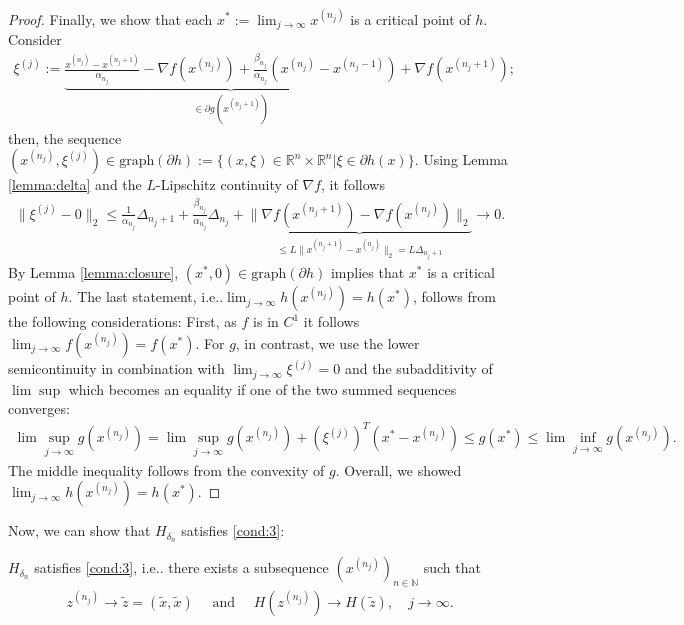 \documentclass[onecolumn,final,a4paper,13pt,reqno]{siamart}
\makeatletter
\DeclareRobustCommand\onedot{\futurelet\@let@token\@onedot}
\def\@onedot{\ifx\@let@token.\else.\null\fi\xspace}
\def\ie{{i.e}\onedot} \def\Ie{{I.e}\onedot}
\makeatother
\begin{document}
\begin{proof}
	Finally, we show that each $x^\ast := \lim_{j \rightarrow \infty} x^{(n_j)}$ is a critical point of $h$. Consider
	\begin{align}
		\xi^{(j)} := \underbrace{\frac{x^{(n_j)} - x^{(n_j + 1)}}{\alpha_{n_j}} - \nabla f(x^{(n_j)}) + \frac{\beta_{n_j}}{\alpha_{n_j}} (x^{(n_j)} - x^{(n_j - 1)})}_{\in \partial g(x^{(n_j + 1)})} + \nabla f(x^{(n_j + 1)});
	\end{align}
	then, the sequence $(x^{(n_j)}, \xi^{(j)}) \in \text{graph}(\partial h) := \{(x, \xi) \in \mathbb{R}^n \times \mathbb{R}^n | \xi \in \partial h(x)\}$. Using Lemma \ref{lemma:delta} and the $L$-Lipschitz continuity of $\nabla f$, it follows
	\begin{align}
		\|\xi^{(j)} - 0\|_2 \leq \frac{1}{\alpha_{n_j}} \Delta_{n_j + 1} + \frac{\beta_{n_j}}{\alpha_{n_j}}\Delta_{n_j} + \underbrace{\|\nabla f(x^{(n_j + 1)}) - \nabla f(x^{(n_j)})\|_2}_{\leq L\|x^{(n_j + 1)} - x^{(n_j)}\|_2 = L\Delta_{n_j + 1}} \rightarrow 0.
	\end{align}
	By Lemma \ref{lemma:closure}, $(x^\ast, 0) \in \text{graph}(\partial h)$ implies that $x^\ast$ is a critical point of $h$. The last statement, \ie $\lim_{j \rightarrow \infty} h(x^{(n_j)}) = h(x^\ast)$, follows from the following considerations: First, as $f$ is in $C^1$ it follows $\lim_{j \rightarrow \infty} f(x^{(n_j)}) = f(x^\ast)$. For $g$, in contrast, we use the lower semicontinuity in combination with $\lim_{j \rightarrow \infty} \xi^{(j)} = 0$ and the subadditivity of $\lim\sup$ which becomes an equality if one of the two summed sequences converges:
	\begin{align}
		\lim\sup_{j \rightarrow \infty} g(x^{(n_j)}) = \lim\sup_{j \rightarrow \infty} g(x^{(n_j)}) + (\xi^{(j)})^T(x^\ast - x^{(n_j)}) \leq g(x^\ast) \leq \lim\inf_{j \rightarrow \infty} g(x^{(n_j)}).
	\end{align}
	The middle inequality follows from the convexity of $g$. Overall, we showed $\lim_{j \rightarrow \infty} h(x^{(n_j)}) = h(x^\ast)$.
\end{proof}

Now, we can show that $H_{\delta_n}$ satisfies \ref{cond:3}:

\begin{lemmamd}
	$H_{\delta_n}$ satisfies \ref{cond:3}, \ie there exists a subsequence $(x^{(n_j)})_{n \in \mathbb{N}}$ such that
	\begin{align}
		z^{(n_j)} \rightarrow \tilde{z} = (\tilde{x}, \tilde{x})\quad\text{ and }\quad H(z^{(n_j)}) \rightarrow H(\tilde{z}),\quad j \rightarrow \infty.
	\end{align}
\end{lemmamd}
\end{document}
